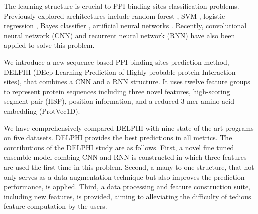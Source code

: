 \documentclass{bioinfo}
\begin{document}
The learning structure is crucial to PPI binding sites classification problems. Previously explored architectures include random forest \citep{wei2016protein, wang2019protein}, SVM \citep{wei2016protein}, logistic regression \citep{zhang2019scriber}, Bayes classifier \citep{murakami2010applying}, artificial neural networks \citep{singh2014springs}. Recently, convolutional neural network (CNN) \citep{zeng2019protein} and recurrent neural network (RNN) \citep{zhang2019sequence} have also been applied to solve this problem. 

We introduce a new sequence-based PPI binding sites prediction method, DELPHI (DEep Learning Prediction of Highly probable protein Interaction sites), that combines a CNN and a RNN structure. It uses twelve feature groups to represent protein sequences including three novel features, high-scoring segment pair (HSP), position information, and a reduced 3-mer amino acid embedding (ProtVec1D).

We have comprehensively compared DELPHI with nine state-of-the-art programs on five datasets. DELPHI provides the best predictions in all metrics. The contributions of the DELPHI study are as follows.
First, a novel fine tuned ensemble model combing CNN and RNN is constructed in which three features are used the first time in this problem. Second, a many-to-one structure, that not only serves as a data augmentation technique but also improves the prediction performance, is applied. Third, a data processing and feature construction suite, including new features, is provided, aiming to alleviating the difficulty of tedious feature computation by the users.
\end{document}
